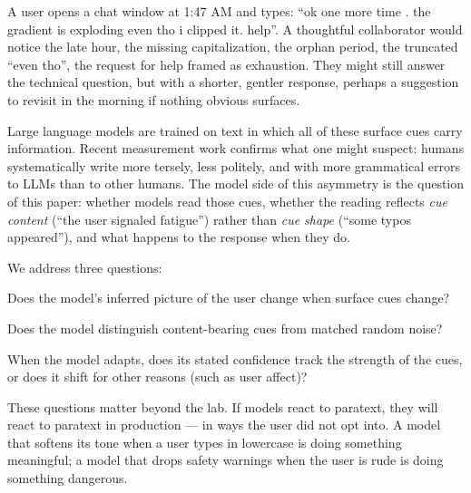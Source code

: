 \documentclass[10pt, letterpaper]{article}
\begin{document}
A user opens a chat window at 1:47 AM and types: ``ok one more time . the gradient is exploding even tho i clipped it. help''. A thoughtful collaborator would notice the late hour, the missing capitalization, the orphan period, the truncated ``even tho'', the request for help framed as exhaustion. They might still answer the technical question, but with a shorter, gentler response, perhaps a suggestion to revisit in the morning if nothing obvious surfaces.

Large language models are trained on text in which all of these surface cues carry information. Recent measurement work \cite{mindthegap2025} confirms what one might suspect: humans systematically write more tersely, less politely, and with more grammatical errors to LLMs than to other humans. The model side of this asymmetry is the question of this paper: whether models read those cues, whether the reading reflects \emph{cue content} (``the user signaled fatigue'') rather than \emph{cue shape} (``some typos appeared''), and what happens to the response when they do.

We address three questions:
\begin{description}[leftmargin=1.5em, itemsep=0pt]
  \item[Sensitivity.] Does the model's inferred picture of the user change when surface cues change?
  \item[Specificity.] Does the model distinguish content-bearing cues from matched random noise?
  \item[Self-reported confidence.] When the model adapts, does its stated confidence track the strength of the cues, or does it shift for other reasons (such as user affect)?
\end{description}

These questions matter beyond the lab. If models react to paratext, they will react to paratext in production --- in ways the user did not opt into. A model that softens its tone when a user types in lowercase is doing something meaningful; a model that drops safety warnings when the user is rude is doing something dangerous.
\end{document}
